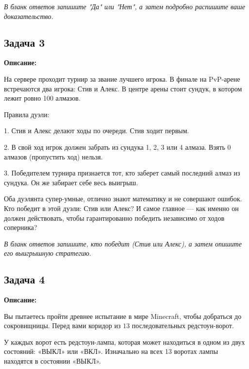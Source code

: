 \documentclass[12pt,a4paper]{article}
\begin{document}
\textit{В бланк ответов запишите "Да" или "Нет", а затем подробно распишите ваше доказательство.}


\newpage

\subsection{Задача 3}

\textbf{Описание:}

На сервере проходит турнир за звание лучшего игрока. В финале на PvP-арене встречаются два игрока: Стив и Алекс. В центре арены стоит сундук, в котором лежит ровно 100 алмазов. 

Правила дуэли:

1. Стив и Алекс делают ходы по очереди. Стив ходит первым.

2. В свой ход игрок должен забрать из сундука 1, 2, 3 или 4 алмаза. Взять 0 алмазов (пропустить ход) нельзя.

3. Победителем турнира признается тот, кто заберет самый последний алмаз из сундука. Он же забирает себе весь выигрыш.

Оба дуэлянта супер-умные, отлично знают математику и не совершают ошибок. Кто победит в этой дуэли: Стив или Алекс? И самое главное — как именно он должен действовать, чтобы гарантированно победить независимо от ходов соперника?

\textit{В бланк ответов запишите, кто победит (Стив или Алекс), а затем опишите его выигрышную стратегию.}


\newpage

\subsection*{Задача 4}

\textbf{Описание:}

Вы пытаетесь пройти древнее испытание в мире Minecraft, чтобы добраться до сокровищницы. Перед вами коридор из $13$ последовательных редстоун-ворот.

У каждых ворот есть редстоун-лампа, которая может находиться в одном из двух состояний: «ВЫКЛ» или «ВКЛ». Изначально на всех 13 воротах лампы находятся в состоянии «ВЫКЛ».
\end{document}
